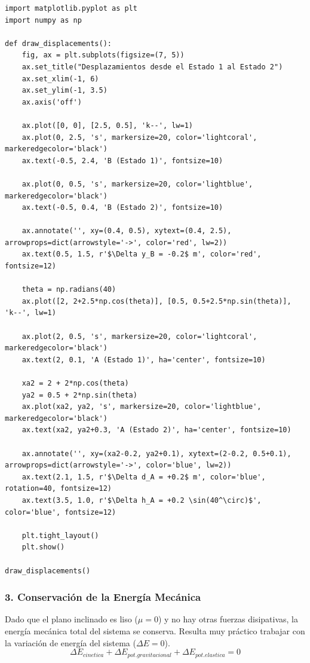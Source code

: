\documentclass[12pt, a4paper]{article}
\begin{document}
\begin{lstlisting}
import matplotlib.pyplot as plt
import numpy as np

def draw_displacements():
    fig, ax = plt.subplots(figsize=(7, 5))
    ax.set_title("Desplazamientos desde el Estado 1 al Estado 2")
    ax.set_xlim(-1, 6)
    ax.set_ylim(-1, 3.5)
    ax.axis('off')
    
    ax.plot([0, 0], [2.5, 0.5], 'k--', lw=1)
    ax.plot(0, 2.5, 's', markersize=20, color='lightcoral', markeredgecolor='black')
    ax.text(-0.5, 2.4, 'B (Estado 1)', fontsize=10)
    
    ax.plot(0, 0.5, 's', markersize=20, color='lightblue', markeredgecolor='black')
    ax.text(-0.5, 0.4, 'B (Estado 2)', fontsize=10)
    
    ax.annotate('', xy=(0.4, 0.5), xytext=(0.4, 2.5), arrowprops=dict(arrowstyle='->', color='red', lw=2))
    ax.text(0.5, 1.5, r'$\Delta y_B = -0.2$ m', color='red', fontsize=12)
    
    theta = np.radians(40)
    ax.plot([2, 2+2.5*np.cos(theta)], [0.5, 0.5+2.5*np.sin(theta)], 'k--', lw=1)
    
    ax.plot(2, 0.5, 's', markersize=20, color='lightcoral', markeredgecolor='black')
    ax.text(2, 0.1, 'A (Estado 1)', ha='center', fontsize=10)
    
    xa2 = 2 + 2*np.cos(theta)
    ya2 = 0.5 + 2*np.sin(theta)
    ax.plot(xa2, ya2, 's', markersize=20, color='lightblue', markeredgecolor='black')
    ax.text(xa2, ya2+0.3, 'A (Estado 2)', ha='center', fontsize=10)
    
    ax.annotate('', xy=(xa2-0.2, ya2+0.1), xytext=(2-0.2, 0.5+0.1), arrowprops=dict(arrowstyle='->', color='blue', lw=2))
    ax.text(2.1, 1.5, r'$\Delta d_A = +0.2$ m', color='blue', rotation=40, fontsize=12)
    ax.text(3.5, 1.0, r'$\Delta h_A = +0.2 \sin(40^\circ)$', color='blue', fontsize=12)
    
    plt.tight_layout()
    plt.show()

draw_displacements()
\end{lstlisting}

\subsubsection*{3. Conservación de la Energía Mecánica}
Dado que el plano inclinado es liso ($\mu = 0$) y no hay otras fuerzas disipativas, la energía mecánica total del sistema se conserva. Resulta muy práctico trabajar con la variación de energía del sistema ($\Delta E = 0$).
$$ \Delta E_{cinetica} + \Delta E_{pot.gravitacional} + \Delta E_{pot.elastica} = 0 $$
\end{document}
